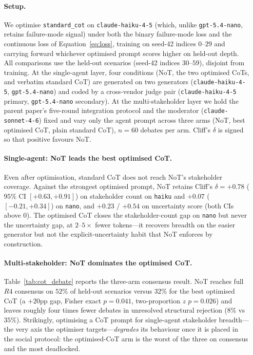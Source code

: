 \documentclass[11pt]{article}
\begin{document}
\paragraph{Setup.}
We optimise \texttt{standard\_cot} on \texttt{claude-haiku-4-5} (which, unlike \texttt{gpt-5.4-nano}, retains failure-mode signal) under both the binary failure-mode loss and the continuous loss of Equation~\ref{eq:loss}, training on seed-42 indices $0$--$29$ and carrying forward whichever optimised prompt scores higher on held-out depth.
All comparisons use the held-out scenarios (seed-42 indices $30$--$59$), disjoint from training.
At the single-agent layer, four conditions (NoT, the two optimised CoTs, and verbatim standard CoT) are generated on two generators (\texttt{claude-haiku-4-5}, \texttt{gpt-5.4-nano}) and coded by a cross-vendor judge pair (\texttt{claude-haiku-4-5} primary, \texttt{gpt-5.4-nano} secondary).
At the multi-stakeholder layer we hold the parent paper's five-round integration protocol and the moderator (\texttt{claude-sonnet-4-6}) fixed and vary only the agent prompt across three arms (NoT, best optimised CoT, plain standard CoT), $n = 60$ debates per arm.
Cliff's $\delta$ is signed so that positive favours NoT.

\paragraph{Single-agent: NoT leads the best optimised CoT.}
Even after optimisation, standard CoT does not reach NoT's stakeholder coverage.
Against the strongest optimised prompt, NoT retains Cliff's $\delta = +0.78$ ($95\%$ CI $[+0.63, +0.91]$) on stakeholder count on \texttt{haiku} and $+0.07$ ($[-0.21, +0.34]$) on \texttt{nano}, and $+0.23$ / $+0.54$ on uncertainty score (both CIs above $0$).
The optimised CoT closes the stakeholder-count gap on \texttt{nano} but never the uncertainty gap, at $2$--$5\times$ fewer tokens---it recovers breadth on the easier generator but not the explicit-uncertainty habit that NoT enforces by construction.

\paragraph{Multi-stakeholder: NoT dominates the optimised CoT.}
Table~\ref{tab:cot_debate} reports the three-arm consensus result.
NoT reaches full $R4$ consensus on $52\%$ of held-out scenarios versus $32\%$ for the best optimised CoT (a $+20$pp gap, Fisher exact $p = 0.041$, two-proportion $z$ $p = 0.026$) and leaves roughly four times fewer debates in unresolved structural rejection ($8\%$ vs $35\%$).
Strikingly, optimising a CoT prompt for single-agent stakeholder breadth---the very axis the optimiser targets---\emph{degrades} its behaviour once it is placed in the social protocol: the optimised-CoT arm is the worst of the three on consensus and the most deadlocked.
\end{document}
